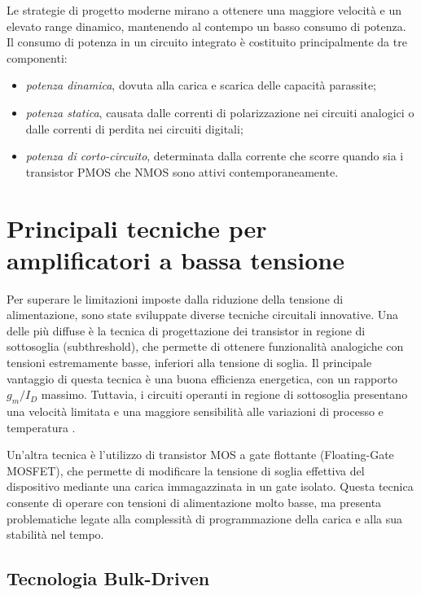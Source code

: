 Le strategie di progetto moderne mirano a ottenere una maggiore velocità e un elevato range dinamico, mantenendo al contempo un basso consumo di potenza. Il consumo di potenza in un circuito integrato è costituito principalmente da tre componenti: 

\begin{itemize}
    \item \textit{potenza dinamica}, dovuta alla carica e scarica delle capacità parassite;
    \item \textit{potenza statica}, causata dalle correnti di polarizzazione nei circuiti analogici o dalle correnti di perdita nei circuiti digitali;
    \item \textit{potenza di corto-circuito}, determinata dalla corrente che scorre quando sia i transistor PMOS che NMOS sono attivi contemporaneamente.
\end{itemize}

\section{Principali tecniche per amplificatori a bassa tensione}

Per superare le limitazioni imposte dalla riduzione della tensione di alimentazione, sono state sviluppate diverse tecniche circuitali innovative. Una delle più diffuse è la tecnica di progettazione dei transistor in regione di sottosoglia (subthreshold), che permette di ottenere funzionalità analogiche con tensioni estremamente basse, inferiori alla tensione di soglia. Il principale vantaggio di questa tecnica è una buona efficienza energetica, con un rapporto $g_m/I_D$ massimo. Tuttavia, i circuiti operanti in regione di sottosoglia presentano una velocità limitata e una maggiore sensibilità alle variazioni di processo e temperatura \cite{Bulk-Driven_CMOS_Amplifier_With_High_EMI_Immunity}.

Un'altra tecnica è l'utilizzo di transistor MOS a gate flottante (Floating-Gate MOSFET), che permette di modificare la tensione di soglia effettiva del dispositivo mediante una carica immagazzinata in un gate isolato. Questa tecnica consente di operare con tensioni di alimentazione molto basse, ma presenta problematiche legate alla complessità di programmazione della carica e alla sua stabilità nel tempo.

\subsection{Tecnologia Bulk-Driven}

